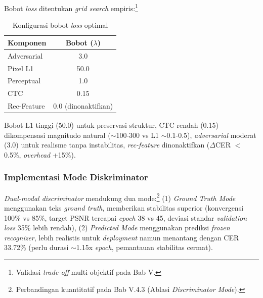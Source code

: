 Bobot \textit{loss} ditentukan \textit{grid search} empiris:\footnote{Validasi \textit{trade-off} multi-objektif pada Bab V.}

\begin{table}[H]
\centering
\caption{Konfigurasi bobot \textit{loss} optimal}
\label{tab:loss-weights}
\small
\begin{tabular}{|l|c|}
\hline
\textbf{Komponen} & \textbf{Bobot ($\lambda$)} \\
\hline
Adversarial & 3.0 \\
Pixel L1 & 50.0 \\
Perceptual & 1.0 \\
CTC & 0.15 \\
Rec-Feature & 0.0 (dinonaktifkan) \\
\hline
\end{tabular}
\end{table}

Bobot L1 tinggi (50.0) untuk preservasi struktur, CTC rendah (0.15) dikompensasi magnitudo natural ($\sim$100-300 vs L1 $\sim$0.1-0.5), \textit{adversarial} moderat (3.0) untuk realisme tanpa instabilitas, \textit{rec-feature} dinonaktifkan ($\Delta$CER $<$0.5\%, \textit{overhead} +15\%).


\subsubsection{Implementasi Mode Diskriminator}
\label{subsubsec:discriminator-mode-impl}

\textit{Dual-modal discriminator} mendukung dua mode:\footnote{Perbandingan kuantitatif pada Bab V.4.3 (Ablasi \textit{Discriminator Mode}).} (1) \textit{Ground Truth Mode} menggunakan teks \textit{ground truth}, memberikan stabilitas superior (konvergensi 100\% vs 85\%, target PSNR tercapai \textit{epoch} 38 vs 45, deviasi standar \textit{validation loss} 35\% lebih rendah), (2) \textit{Predicted Mode} menggunakan prediksi \textit{frozen recognizer}, lebih realistis untuk \textit{deployment} namun menantang dengan CER 33.72\% (perlu durasi $\sim$1.15x \textit{epoch}, pemantauan stabilitas cermat).


